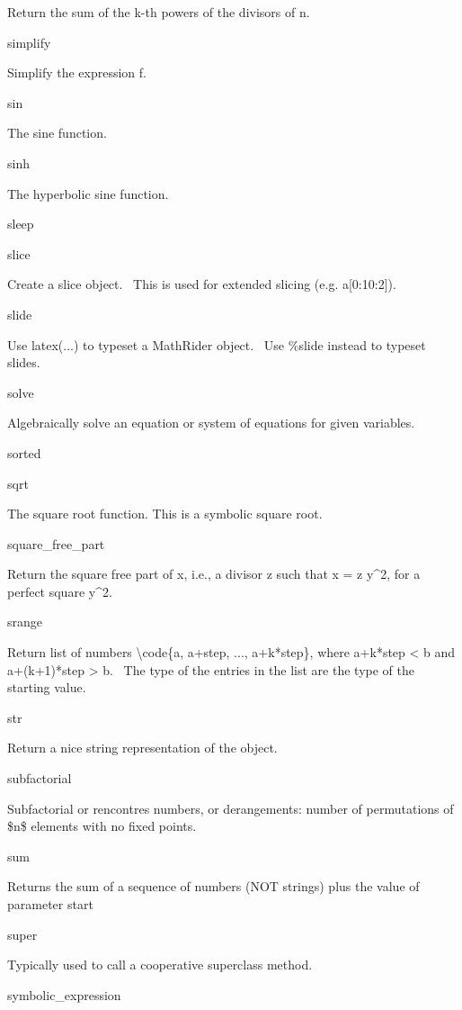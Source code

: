 \documentclass[12pt,twoside]{book}
\begin{document}
Return the sum of the k{}-th powers of the divisors of n.

simplify

Simplify the expression f.

sin

The sine function.

sinh

The hyperbolic sine function.

sleep


\bigskip

slice

Create a slice object. \ This is used for extended slicing (e.g.
a[0:10:2]).

slide

Use latex(...) to typeset a MathRider object. \ Use \%slide instead to
typeset slides.

solve

Algebraically solve an equation or system of equations for given
variables.

sorted


\bigskip

sqrt

The square root function. This is a symbolic square root.

square\_free\_part

Return the square free part of x, i.e., a divisor z such that x = z
y\^{}2, for a perfect square y\^{}2.

srange

Return list of numbers {\textbackslash}code\{a, a+step, ..., a+k*step\},
where a+k*step {\textless} b and a+(k+1)*step {\textgreater} b. \ The
type of the entries in the list are the type of the starting value.

str

Return a nice string representation of the object.

subfactorial

Subfactorial or rencontres numbers, or derangements: number of
permutations of \$n\$ elements with no fixed points.

sum

Returns the sum of a sequence of numbers (NOT strings) plus the value of
parameter {\textquotesingle}start{\textquotesingle}

super

Typically used to call a cooperative superclass method.

symbolic\_expression 


\bigskip
\end{document}
